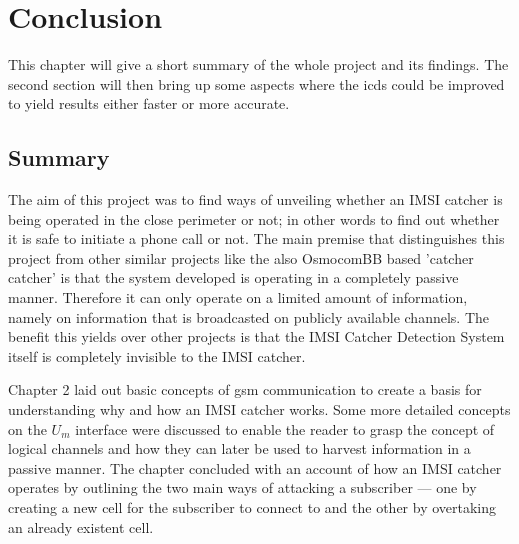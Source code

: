 \chapter{Conclusion}
This chapter will give a short summary of the whole project and its findings.
The second section will then bring up some aspects where the \gls{icds} could be improved to yield results either faster or more accurate.

\section{Summary}
The aim of this project was to find ways of unveiling whether an IMSI catcher is being operated in the close perimeter or not; in other words to find out whether it is safe to initiate a phone call or not.
The main premise that distinguishes this project from other similar projects like the also  OsmocomBB based 'catcher catcher' is that the system developed is operating in a completely passive manner.
Therefore it can only operate on a limited amount of information, namely on information that is broadcasted on publicly available channels.
The benefit this yields over other projects is that the IMSI Catcher Detection System itself is completely invisible to the IMSI catcher.

Chapter 2 laid out basic concepts of \gls{gsm} communication to create a basis for understanding why and how an IMSI catcher works.
Some more detailed concepts on the $U_m$ interface were discussed to enable the reader to grasp the concept of logical channels and how they can later be used to harvest information in a passive manner.
The chapter concluded with an account of how an IMSI catcher operates by outlining the two main ways of attacking a subscriber --- one by creating a new cell for the subscriber to connect to and the other by overtaking an already existent cell.

